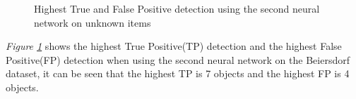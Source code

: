 \begin{figure}[h]
    \centering
    \hfill
    
    \caption{Highest True and False Positive detection using the second neural network on unknown items}
    \label{fig:v2max}
\end{figure}

\textit{Figure \ref{fig:v2max}} shows the highest True Positive(TP) detection and the highest False Positive(FP) detection when using the second neural network on the Beiersdorf dataset, it can be seen that the highest TP is 7 objects and the highest FP is 4 objects.

\clearpage
